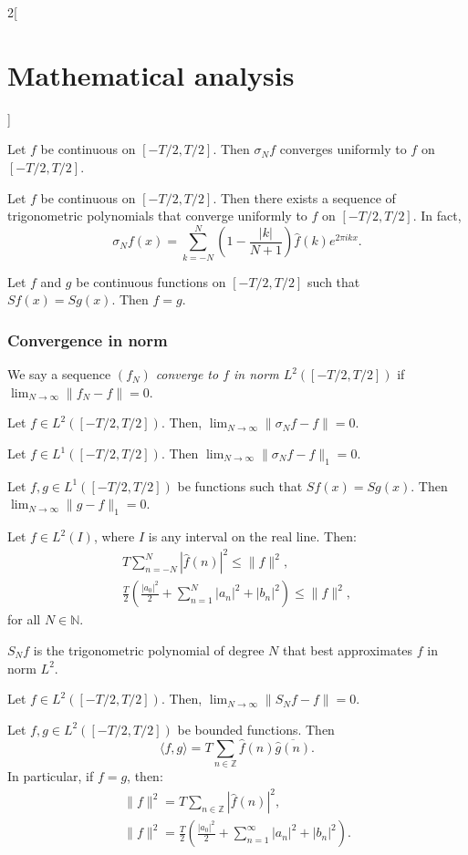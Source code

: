 \documentclass[class=article,crop=false]{standalone}
\begin{document}
\begin{multicols}{2}[\section{Mathematical analysis}]
\begin{theorem}
Let $f$ be continuous on $[-T/2,T/2]$. Then $\sigma_Nf$ converges uniformly to $f$ on $[-T/2,T/2]$.
\end{theorem}
\begin{corollary}
Let $f$ be continuous on $[-T/2,T/2]$. Then there exists a sequence of trigonometric polynomials that converge uniformly to $f$ on $[-T/2,T/2]$. In fact, $$\sigma_Nf(x)=\sum_{k=-N}^N\left(1-\frac{|k|}{N+1}\right)\widehat{f}(k)e^{2\pi ikx}.$$
\end{corollary}
\begin{corollary}
Let $f$ and $g$ be continuous functions on $[-T/2,T/2]$ such that $Sf(x)=Sg(x)$. Then $f=g$.
\end{corollary}
\subsubsection{Convergence in norm}
\begin{definition}
We say a sequence $(f_N)$ \textit{converge to $f$ in norm $L^2([-T/2,T/2])$} if $\displaystyle\lim_{N\to\infty}\|f_N-f\|=0$.
\end{definition}
\begin{theorem}
Let $f\in L^2([-T/2,T/2])$. Then, $\displaystyle\lim_{N\to\infty}\|\sigma_Nf-f\|=0$.
\end{theorem}
\begin{corollary}
Let $f\in L^1([-T/2,T/2])$. Then $\displaystyle\lim_{N\to\infty}\|\sigma_Nf-f\|_1=0$.
\end{corollary}
\begin{corollary}
Let $f,g\in L^1([-T/2,T/2])$ be functions such that $Sf(x)=Sg(x)$. Then $\displaystyle\lim_{N\to\infty}\|g-f\|_1=0$.
\end{corollary}
\begin{theorem}
Let $f\in L^2(I)$, where $I$ is any interval on the real line. Then: \begin{gather*}T\sum_{n=-N}^N|\widehat{f}(n)|^2\leq\|f\|^2,\\\frac{T}{2}\left(\frac{|a_0|^2}{2}+\sum_{n=1}^N|a_n|^2+|b_n|^2\right)\leq \|f\|^2,\end{gather*} for all $N\in\mathbb{N}$.
\end{theorem}
\begin{theorem}
$S_Nf$ is the trigonometric polynomial of degree $N$ that best approximates $f$ in norm $L^2$.
\end{theorem}
\begin{corollary}
Let $f\in L^2([-T/2,T/2])$. Then, $\displaystyle\lim_{N\to\infty}\|S_Nf-f\|=0$.
\end{corollary}
\begin{theorem}
Let $f,g\in L^2([-T/2,T/2])$ be bounded functions. Then $$\langle f,g\rangle=T\sum_{n\in\mathbb{Z}}\widehat{f}(n)\overline{\widehat{g}(n)}.$$
In particular, if $f=g$, then:
\begin{gather*}\|f\|^2=T\sum_{n\in\mathbb{Z}}|\widehat{f}(n)|^2,\\\|f\|^2=\frac{T}{2}\left(\frac{|a_0|^2}{2}+\sum_{n=1}^\infty|a_n|^2+|b_n|^2\right).\end{gather*}
\end{theorem}

\end{multicols}
\end{document}
